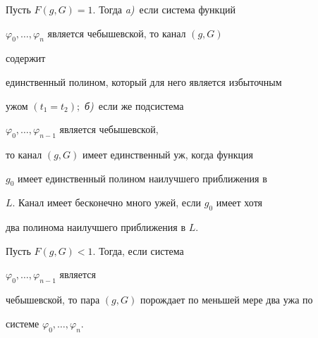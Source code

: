  


\begin{thm} Пусть $F(g,G)=1$. Тогда {\em a)}~если система функций 


$\varphi_0,\dotsc,\varphi_n$ является чебышевской, то канал $(g,G)$ 


содержит 


единственный полином, который для него является избыточным 


ужом $(t_1=t_2);$ {\em б)}~если же подсистема 


$\varphi_0,\dotsc,\varphi_{n-1}$ является чебышевской, 


то канал $(g,G)$ имеет единственный уж, когда функция 


$g_0$ имеет единственный полином наилучшего приближения в 


$L$. Канал имеет бесконечно много ужей, если $g_0$ имеет хотя 


два полинома наилучшего приближения в $L$. 


 


Пусть $F(g,G)<1$. Тогда, если система 


$\varphi_0,\dotsc,\varphi_{n-1}$ является 


чебышевской, то пара $(g,G)$ порождает по меньшей мере два ужа по 


системе $\varphi_0,\dotsc,\varphi_n$. 


\end{thm} 


 


